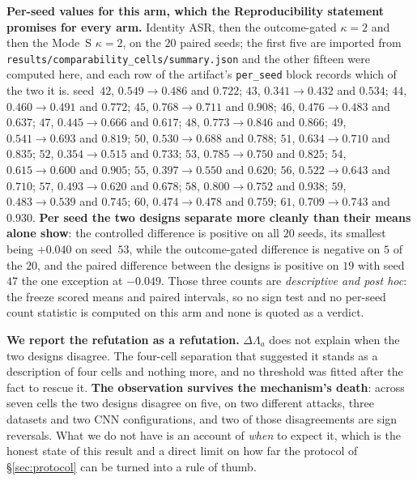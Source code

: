 \documentclass{article}
\begin{document}
\textbf{Per-seed values for this arm, which the Reproducibility statement promises for every arm.} Identity ASR, then the outcome-gated $\kappa{=}2$ and then the Mode~S $\kappa{=}2$, on the $20$ paired seeds; the first five are imported from \texttt{results/\allowbreak comparability\_\allowbreak cells/\allowbreak summary.json} and the other fifteen were computed here, and each row of the artifact's \texttt{per\_seed} block records which of the two it is. seed~$42$, $0.549 \to 0.486$ and $0.722$; $43$, $0.341 \to 0.432$ and $0.534$; $44$, $0.460 \to 0.491$ and $0.772$; $45$, $0.768 \to 0.711$ and $0.908$; $46$, $0.476 \to 0.483$ and $0.637$; $47$, $0.445 \to 0.666$ and $0.617$; $48$, $0.773 \to 0.846$ and $0.866$; $49$, $0.541 \to 0.693$ and $0.819$; $50$, $0.530 \to 0.688$ and $0.788$; $51$, $0.634 \to 0.710$ and $0.835$; $52$, $0.354 \to 0.515$ and $0.733$; $53$, $0.785 \to 0.750$ and $0.825$; $54$, $0.615 \to 0.600$ and $0.905$; $55$, $0.397 \to 0.550$ and $0.620$; $56$, $0.522 \to 0.643$ and $0.710$; $57$, $0.493 \to 0.620$ and $0.678$; $58$, $0.800 \to 0.752$ and $0.938$; $59$, $0.483 \to 0.539$ and $0.745$; $60$, $0.474 \to 0.478$ and $0.759$; $61$, $0.709 \to 0.743$ and $0.930$. \textbf{Per seed the two designs separate more cleanly than their means alone show}: the controlled difference is positive on all $20$ seeds, its smallest being $+0.040$ on seed~$53$, while the outcome-gated difference is negative on $5$ of the $20$, and the paired difference between the designs is positive on $19$ with seed~$47$ the one exception at $-0.049$. Those three counts are \emph{descriptive and post hoc}: the freeze scored means and paired intervals, so no sign test and no per-seed count statistic is computed on this arm and none is quoted as a verdict.

\textbf{We report the refutation as a refutation.} $\Delta\Lambda_a$ does not explain when the two designs disagree. The four-cell separation that suggested it stands as a description of four cells and nothing more, and no threshold was fitted after the fact to rescue it. \textbf{The observation survives the mechanism's death}: across seven cells the two designs disagree on five, on two different attacks, three datasets and two CNN configurations, and two of those disagreements are sign reversals. What we do not have is an account of \emph{when} to expect it, which is the honest state of this result and a direct limit on how far the protocol of §\ref{sec:protocol} can be turned into a rule of thumb.
\end{document}
